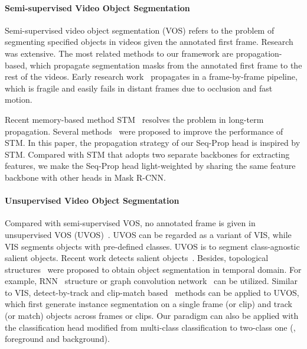 \documentclass[10pt,twocolumn,letterpaper]{article}
\begin{document}
	\paragraph{Semi-supervised Video Object Segmentation}
	Semi-supervised video object segmentation (VOS) \cite{Perazzi2016, Pont-Tuset_arXiv_2017} refers to the problem of segmenting specified objects in videos given the annotated first frame. Research \cite{caelles2017one,perazzi2017learning,oh2019video,wug2018fast,voigtlaender2019feelvos,lin2019agss,goutam2020learning,lu2020video} was extensive. The most related methods to our framework are propagation-based, which propagate segmentation masks from the annotated first frame to the rest of the videos. Early research work~\cite{perazzi2017learning,khoreva2017lucid,yang2018efficient,wug2018fast} propagates in a frame-by-frame pipeline, which is fragile and easily fails in distant frames due to occlusion and fast motion. 
	
	Recent memory-based method STM~\cite{oh2019video} resolves the problem in long-term propagation. Several methods~\cite{wumemory,zhang2020transductive,lu2020video,seong2020kernelized} were proposed to improve the performance of STM. In this paper, the propagation strategy of our Seq-Prop head is inspired by STM. Compared with STM that adopts two separate backbones for extracting features, we make the Seq-Prop head light-weighted by sharing the same feature backbone with other heads in Mask R-CNN.
	
	\vspace{-0.05in}
	
	\paragraph{Unsupervised Video Object Segmentation}
	Compared with semi-supervised VOS, no annotated frame is given in unsupervised VOS (UVOS)~\cite{Caelles_arXiv_2019}. UVOS can be regarded as a variant of VIS, while VIS segments objects with pre-defined classes. UVOS is to segment class-agnostic salient objects.
	Recent work detects salient objects~\cite{wang2019learning,lu2020learning,song2018pyramid,zhou2020matnet}. Besides, 
	topological structures~\cite{ventura2019rvos,wang2019agnn} were proposed to obtain object segmentation in temporal domain. For example, RNN~\cite{ventura2019rvos} structure or graph convolution network~\cite{wang2019agnn} can be utilized. 
	Similar to VIS, detect-by-track \cite{luiten2020unovost} and clip-match based~\cite{athar2020stem} methods can be applied to UVOS, which first generate instance segmentation on a single frame (or clip) and track (or match) objects across frames or clips.
	Our paradigm can also be applied with the classification head modified from multi-class classification to two-class one (\ie, foreground and background).
	
\end{document}
